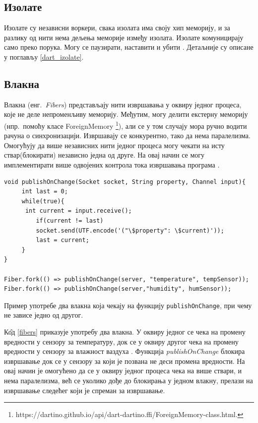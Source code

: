 \documentclass[12pt,oneside]{memoir}
\begin{document}
\subsection{Изолате}

Изолате су независни воркери, свака изолата има своју хип меморију, и за разлику од нити нема дељења меморије између изолата. Изолате комуницирају само преко порука. Могу се паузирати, наставити и убити \cite{procesi_i_izolate}. Детаљније су описане у поглављу \ref{dart_izolate}.

\subsection{Влакна}
\label{vlakna}

Влакна (енг.~\textit{Fibers}) представљају нити извршавања у оквиру једног процеса, које не деле непроменљиву меморију. Међутим, могу делити екстерну меморију (нпр.~помоћу класе ForeignMemory \footnote{https://dartino.github.io/api/dart-dartino.ffi/ForeignMemory-class.html.}), али се у том случају мора ручно водити рачуна о синхронизацији. Извршавају се конкурентно, тако да нема паралелизма. Омогућују да више независних нити једног процеса могу чекати на исту ствар(блокирати) независно једна од друге. На овај начин се могу имплементирати више одвојених контрола тока извршавања програма \cite{korutine_i_vlakna}.

\begin{listing}
\begin{verbatim}
void publishOnChange(Socket socket, String property, Channel input){
  	 int last = 0;
  	 while(true){
   	  int current = input.receive();
    	 if(current != last)
      	 socket.send(UTF.encode('("\$property": \$current)'));
    	 last = current;
  	 }
}

Fiber.fork(() => publishOnChange(server, "temperature", tempSensor));
Fiber.fork(() => publishOnChange(server,"humidity", humSensor));
\end{verbatim}
\caption{Пример употребе два влакна која чекају на функцију \texttt{publishOnChange}, при чему не зависе једно од другог.}
\label{fibers}
\end{listing}

К\^{о}д \ref{fibers} приказује употребу два влакна. У оквиру једног се чека на промену вредности у сензору за температуру, док се у оквиру другог чека на промену вредности у сензору за влажност ваздуха \cite{Dartino}. Функција \textit{publishOnChange} блокира извршавање док се у сензору за који је позвана не деси промена вредности. На овај начин је омогућено да се у оквиру једног процеса чека на више ствари, и нема паралелизма, већ се уколико дође до блокирања у једном влакну, прелази на извршавање следећег који је спреман за извршавање.
\end{document}
